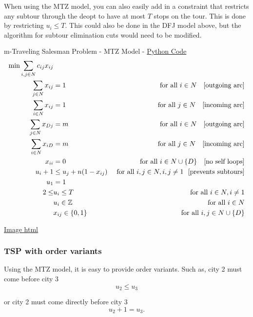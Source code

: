 When using the MTZ model, you can also easily add in a constraint that restricts any subtour through the deopt to have at most $T$ stops on the tour.  This is done by restricting $u_i \leq T$.  
This could also be done in the DFJ model above, but the algorithm for subtour elimination cuts would need to be modified.

\begin{general}{m-Traveling Salesman Problem - MTZ Model - }{}
\href{https://github.com/open-optimization/open-optimization-or-examples/blob/master/integer-programming/tsp-mtz/m_TSP_with_MTZ_Model.ipynb}{Python Code}
\begin{align}
\min \sum_{i,j \in N} c_{ij} x_{ij}\\
\sum_{j\in N} x_{ij} &= 1 & \mbox{ for all } i \in N \ \ \mbox{ [outgoing arc]}\\
\sum_{i \in N} x_{ij} &= 1 & \mbox{ for all } j \in N \ \ \mbox{ [incoming arc]}\\
\sum_{j\in N} x_{Dj} &= m & \mbox{ for all } i \in N \ \ \mbox{ [outgoing arc]}\\
\sum_{i \in N} x_{iD} &= m & \mbox{ for all } j \in N \ \ \mbox{ [incoming arc]}\\
x_{ii} &= 0 & \mbox{ for all } i \in N\cup\{D\} \ \ \mbox{ [no self loops]} \\
u_i + 1 & \leq u_j + n(1-x_{ij})  & \mbox{ for all } i,j \in N, i,j \neq 1 \ \ \mbox{[prevents subtours]}\\
u_1 &= 1\\
2 \leq & u_i \leq T & \mbox{ for all } i \in N, i \neq 1\\
& u_i \in {\mathbb{Z}} & \mbox{ for all } i \in N\\
& x_{ij} \in \{0,1\} & \mbox{ for all } i,j \in N\cup\{D\}
\end{align}
\end{general}

\href{https://github.com/open-optimization/open-optimization-or-examples/blob/master/integer-programming/tsp-mtz/houses_and_restaurants_assignment.html}{Image html}

\subsubsection{TSP with order variants}
Using the MTZ model, it is easy to provide order variants.  Such as, city 2 must come before city 3
$$
u_2 \leq u_3
$$

or city 2 must come directly before city 3
$$
u_2 + 1 = u_3.
$$

